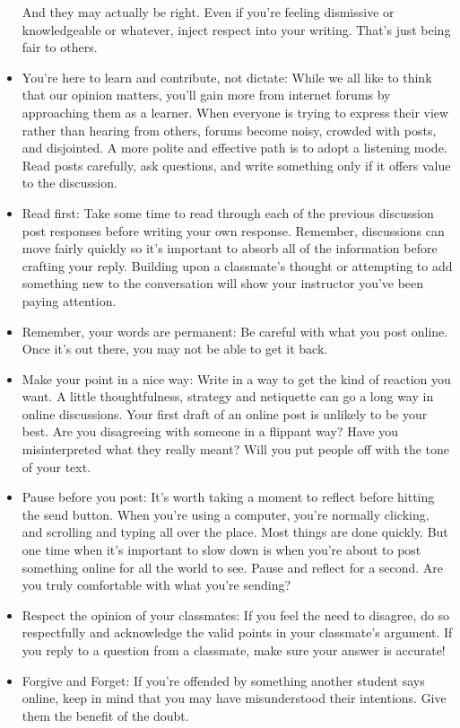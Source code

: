 \documentclass{article}
\begin{document}
\begin{itemize}
    And they may actually be right.
    Even if you're feeling dismissive or knowledgeable or whatever, 
    inject respect into your writing. That's just being fair to others.
    \item You're here to learn and contribute, not dictate: 
    While we all like to think that our opinion matters, you'll gain more 
    from internet forums by approaching them as a learner.
    When everyone is trying to express their view rather than 
    hearing from others, forums become noisy, crowded with posts, and disjointed. 
    A more polite and effective path is to adopt a listening mode. 
    Read posts carefully, ask questions, and write something only if it offers 
    value to the discussion.
    \item Read first:
    Take some time to read through each of the previous discussion post responses 
    before writing your own response. Remember, discussions can move fairly quickly 
    so it’s important to absorb all of the information before crafting your reply. 
    Building upon a classmate’s thought or attempting to add something new to the 
    conversation will show your instructor you’ve been paying attention.
    \item Remember, your words are permanent: Be careful with what you post online. 
    Once it's out there, you may not be able to get it back.
    \item Make your point in a nice way:
    Write in a way to get the kind of reaction you want. A little thoughtfulness, 
    strategy and netiquette can go a long way in online discussions.
    Your first draft of an online post is unlikely to be your best. 
    Are you disagreeing with someone in a flippant way? Have you misinterpreted what 
    they really meant? Will you put people off with the tone of your text.
    \item Pause before you post:
    It's worth taking a moment to reflect before hitting the send button.
    When you're using a computer, you're normally clicking, and scrolling and 
    typing all over the place. Most things are done quickly. But one time when it's important 
    to slow down is when you're about to post something online for all the world to see. 
    Pause and reflect for a second. Are you truly comfortable with what you're sending?
    \item Respect the opinion of your classmates: 
    If you feel the need to disagree, do so respectfully and acknowledge the valid points in your classmate's argument. If you reply to a question from a classmate, make sure your answer is accurate!
    \item Forgive and Forget: 
    If you’re offended by something another student says online, keep in mind that you may have misunderstood their intentions. Give them the benefit of the doubt.
   
 \end{itemize}
\pagebreak
\end{document}
